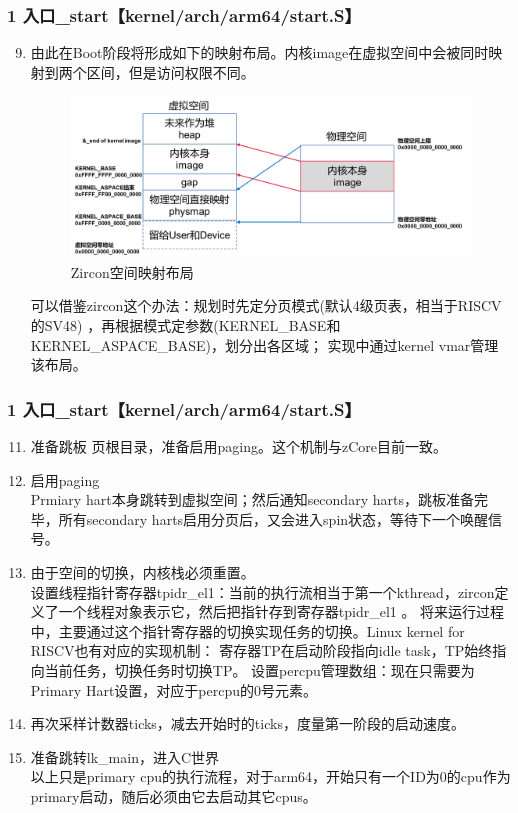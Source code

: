 \documentclass[
8pt, %
]{beamer}
\begin{document}
	\begin{frame}
		\frametitle{1 入口\_start【kernel/arch/arm64/start.S】}
		\begin{enumerate}\setcounter{enumi}{8}
			\item 由此在Boot阶段将形成如下的映射布局。内核image在虚拟空间中会被同时映射到两个区间，但是访问权限不同。
			\begin{figure}
				\includegraphics[width=0.6\linewidth]{zircon_aspace.png}
				\caption{Zircon空间映射布局}
			\end{figure}

			\begin{block}{}
				可以借鉴zircon这个办法：规划时先定分页模式(默认4级页表，相当于RISCV的SV48) ，再根据模式定参数(KERNEL\_BASE和KERNEL\_ASPACE\_BASE)，划分出各区域；
				实现中通过kernel vmar管理该布局。
			\end{block}
		\end{enumerate}
	\end{frame}

	\begin{frame}
		\frametitle{1 入口\_start【kernel/arch/arm64/start.S】}
		\begin{enumerate}\setcounter{enumi}{10}
			\item 准备跳板 页根目录，准备启用paging。这个机制与zCore目前一致。
			\item 启用paging\\
			Prmiary hart本身跳转到虚拟空间；然后通知secondary harts，跳板准备完毕，所有secondary harts启用分页后，又会进入spin状态，等待下一个唤醒信号。
			\item 由于空间的切换，内核栈必须重置。\\
			设置线程指针寄存器tpidr\_el1：当前的执行流相当于第一个kthread，zircon定义了一个线程对象表示它，然后把指针存到寄存器tpidr\_el1 。
			将来运行过程中，主要通过这个指针寄存器的切换实现任务的切换。Linux kernel for RISCV也有对应的实现机制：
			寄存器TP在启动阶段指向idle task，TP始终指向当前任务，切换任务时切换TP。
			设置percpu管理数组：现在只需要为Primary Hart设置，对应于percpu的0号元素。
			\item 再次采样计数器ticks，减去开始时的ticks，度量第一阶段的启动速度。
			\item 准备跳转lk\_main，进入C世界\\
			以上只是primary cpu的执行流程，对于arm64，开始只有一个ID为0的cpu作为primary启动，随后必须由它去启动其它cpus。
		\end{enumerate}
	\end{frame}
\end{document}
